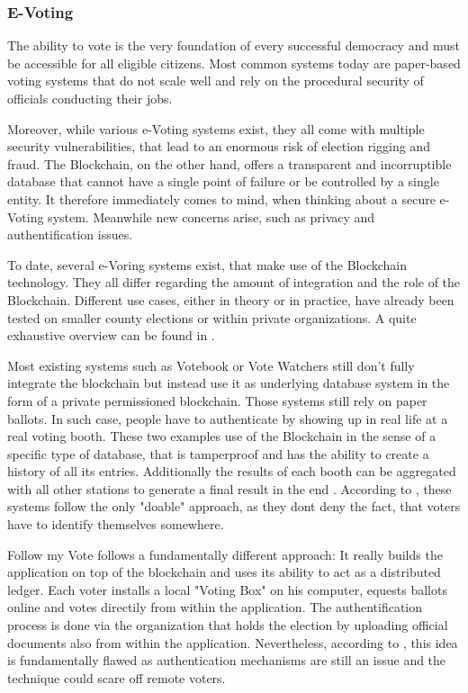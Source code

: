 \subsubsection{E-Voting}
The ability to vote is the very foundation of every successful democracy and must be accessible for all eligible citizens. Most common systems today are paper-based voting systems that do not scale well and rely on the procedural security of officials conducting their jobs.

Moreover, while various e-Voting systems exist, they all come with multiple security vulnerabilities, that lead to an enormous risk of election rigging and fraud.
The Blockchain, on the other hand, offers a transparent and incorruptible database that cannot have a single point of failure or be controlled by a single entity. It therefore immediately comes to mind, when thinking about a secure e-Voting system. Meanwhile new concerns arise, such as privacy and authentification issues.

To date, several e-Voring systems exist, that make use of the Blockchain technology. They all differ regarding the amount of integration and the role of the Blockchain. Different use cases, either in theory or in practice, have already been tested on smaller county elections or within private organizations. A quite exhaustive overview can be found in  \cite{BenAyed2017}.

Most existing systems such as Votebook \cite{Kirby2016} or Vote Watchers \cite{BlockchainTechnologiesCorporation} still don't fully integrate the blockchain but instead use it as underlying database system in the form of a private permissioned blockchain. Those systems still rely on paper ballots. In such case, people have to authenticate by showing up in real life at a real voting booth. These two examples use of the Blockchain in the sense of a specific type of database, that is tamperproof and has the ability to create a history of all its entries. Additionally the results of each booth can be aggregated with all other stations to generate a final result in the end \cite{BenAyed2017}.
According to \citeauthor{Osgood2016}, these systems follow the only "doable" approach, as they dont deny the fact, that voters have to identify themselves somewhere.

Follow my Vote \cite{FollowMyVote} follows a fundamentally different approach: It really builds the application on top of the blockchain and uses its ability to act as a distributed ledger. Each voter installs a local "Voting Box" on his computer, equests ballots online and votes directily from within the application. The authentification process is done via the organization that holds the election by uploading official documents also from within the application. Nevertheless, according to \citeauthor{Osgood2016}, this idea is fundamentally flawed as authentication mechanisms are still an issue and the technique could scare off remote voters.

